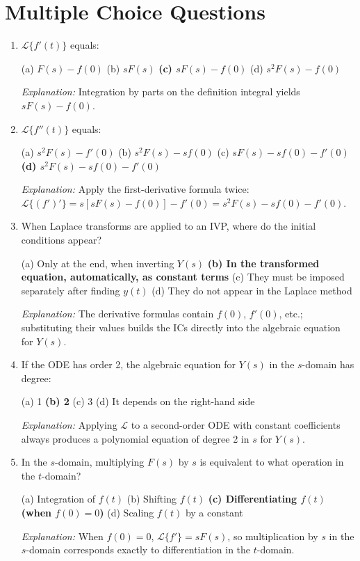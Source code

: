 \documentclass[12pt,a4paper]{article}
\begin{document}
\section{Multiple Choice Questions}

\begin{enumerate}

\item $\mathcal{L}\{f'(t)\}$ equals:

(a) $F(s) - f(0)$ \quad
(b) $sF(s)$ \quad
\textbf{(c) $sF(s) - f(0)$} \quad
(d) $s^2F(s) - f(0)$

\textit{Explanation:} Integration by parts on the definition integral
yields $sF(s) - f(0)$.

\item $\mathcal{L}\{f''(t)\}$ equals:

(a) $s^2F(s) - f'(0)$ \quad
(b) $s^2F(s) - sf(0)$ \quad
(c) $sF(s) - sf(0) - f'(0)$ \quad
\textbf{(d) $s^2F(s) - sf(0) - f'(0)$}

\textit{Explanation:} Apply the first-derivative formula twice:
$\mathcal{L}\{(f')'\} = s[sF(s)-f(0)] - f'(0) = s^2F(s)-sf(0)-f'(0)$.

\item When Laplace transforms are applied to an IVP, where do the
initial conditions appear?

(a) Only at the end, when inverting $Y(s)$ \quad
\textbf{(b) In the transformed equation, automatically, as constant
terms} \quad
(c) They must be imposed separately after finding $y(t)$ \quad
(d) They do not appear in the Laplace method

\textit{Explanation:} The derivative formulas contain $f(0)$, $f'(0)$,
etc.; substituting their values builds the ICs directly into the
algebraic equation for $Y(s)$.

\item If the ODE has order 2, the algebraic equation for $Y(s)$ in the
$s$-domain has degree:

(a) 1 \quad
\textbf{(b) 2} \quad
(c) 3 \quad
(d) It depends on the right-hand side

\textit{Explanation:} Applying $\mathcal{L}$ to a second-order ODE with
constant coefficients always produces a polynomial equation of degree 2
in $s$ for $Y(s)$.

\item In the $s$-domain, multiplying $F(s)$ by $s$ is equivalent to
what operation in the $t$-domain?

(a) Integration of $f(t)$ \quad
(b) Shifting $f(t)$ \quad
\textbf{(c) Differentiating $f(t)$ (when $f(0)=0$)} \quad
(d) Scaling $f(t)$ by a constant

\textit{Explanation:} When $f(0)=0$, $\mathcal{L}\{f'\} = sF(s)$, so
multiplication by $s$ in the $s$-domain corresponds exactly to
differentiation in the $t$-domain.

\end{enumerate}
\end{document}
